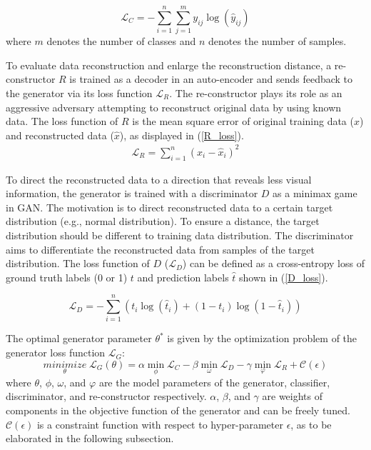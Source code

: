 \documentclass[]{elsarticle}
\begin{document}
	\begin{equation}
	\mathcal{L}_C=-\sum_{i=1}^n\sum_{j=1}^m y_{ij} \log(\hat y_{ij})  
	\label{C_loss}
	\end{equation}
	where $m$ denotes the number of classes and $n$ denotes the number of samples.
	
	To evaluate data reconstruction and enlarge the reconstruction distance, a re-constructor $R$ is trained as a decoder in an auto-encoder and sends feedback to the generator via its loss function $\mathcal{L}_R$. The re-constructor plays its role as an aggressive adversary attempting to reconstruct original data by using known data. The loss function of $R$ is the mean square error of original training data ($x$) and reconstructed data ($\hat x$), as displayed in (\ref{R_loss}).
	\begin{align}
	\mathcal{L}_R = \sum_{i=1}^n{(x_i - \hat x_i)^2} 
	\label{R_loss}
	\end{align}   
	
	To direct the reconstructed data to a direction that reveals less visual information, the generator is trained with a discriminator $D$ as a minimax game in GAN. The motivation is to direct reconstructed data to a certain target distribution (e.g., normal distribution). To ensure a distance, the target distribution should be different to training data distribution. The discriminator aims to differentiate the reconstructed data from samples of the target distribution. The loss function of $D$ ($\mathcal{L}_D$) can be defined as a cross-entropy loss of ground truth labels (0 or 1) $t$ and prediction labels $\hat t$ shown in (\ref{D_loss}).
	
	\begin{equation}
	\mathcal{L}_D = -\sum_{i=1}^n{(t_i\log(\hat t_i) + (1 - t_i)\log(1 - \hat t_i))} 
	\label{D_loss}
	\end{equation}
	
	The optimal generator parameter $\theta^*$ is given by the optimization problem of the generator loss function  $\mathcal{L}_G$:
	\begin{equation}
	\underset{\theta}{minimize} \; \mathcal{L}_G(\theta) = \alpha \min\limits_{\phi}{\mathcal{L}_C} - \beta\min\limits_{\omega}{\mathcal{L}_D}
	-\gamma\min\limits_{\varphi}{\mathcal{L}_R} + \mathcal{C}(\epsilon)
	\label{eqn:G_loss}
	\end{equation}  
	where $\theta$, $\phi$, $\omega$, and $\varphi$ are the model parameters of the generator, classifier, discriminator, and re-constructor respectively. $\alpha$, $\beta$, and $\gamma$ are weights of components in the objective function of the generator and can be freely tuned. $\mathcal{C}(\epsilon)$ is a constraint function with respect to hyper-parameter $\epsilon$, as to be elaborated in the following subsection.
	
\end{document}
